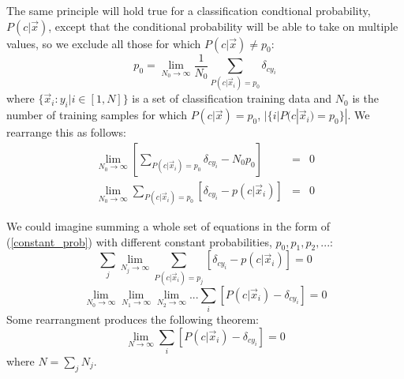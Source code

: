 \documentclass{article}
\begin{document}
The same principle will hold true for a classification condtional probability,
$P(c|\vec x)$, except that the conditional probability will be able to take
on multiple values, so we exclude all those for which $P(c|\vec x) \ne p_0$:
\begin{equation}
p_0 = \lim_{N_0 \rightarrow \infty} \frac{1}{N_0} \sum_{P(c|\vec x_i)=p_0} \delta_{cy_i}
\end{equation}
where $\lbrace \vec x_i : y_i | i \in [1, N] \rbrace$ is a set of classification
training data 
and $N_0$ is the number of training samples for which $P(c|\vec x)=p_0$,
$|\lbrace i | P(c|\vec x_i) = p_0 \rbrace |$.
We rearrange this as follows:
\begin{eqnarray}
\lim_{N_0 \rightarrow \infty} \left [\sum_{P(c|\vec x_i)=p_0} \delta_{cy_i} - N_0 p_0 \right ] & = & 0 \\
\lim_{N_0 \rightarrow \infty} \sum_{P(c|\vec x_i)=p_0} \left [\delta_{cy_i} - p(c | \vec x_i) \right ] & = & 0 \label{constant_prob}
\end{eqnarray}

We could imagine summing a whole set of equations in the form of 
(\ref{constant_prob}) with different constant probabilities, $p_0, p_1, p_2, ...$:
\begin{equation}
\sum_j \lim_{N_j \rightarrow \infty} \sum_{P(c|\vec x_i)=p_j} \left [\delta_{cy_i} - p(c | \vec x_i) \right ] = 0
\end{equation}
\begin{equation}
\lim_{N_0 \rightarrow \infty} \lim_{N_1 \rightarrow \infty} \lim_{N_2 \rightarrow \infty} ... \sum_i \left [ P(c|\vec x_i) - \delta_{cy_i} \right ] = 0
\end{equation}
Some rearrangment produces the following theorem:
\begin{equation}
\lim_{N \rightarrow \infty} \sum_i \left [ P(c|\vec x_i) - \delta_{cy_i} \right ] = 0
\end{equation}
where $N=\sum_j N_j$.


\end{document}
